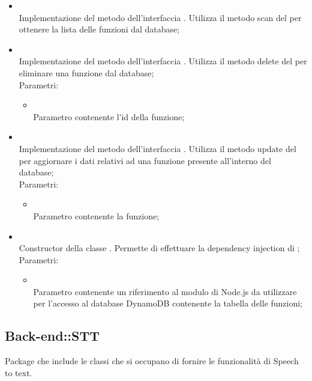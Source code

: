 \begin{itemize}
\begin{itemize}
		\item[]  \\
		Implementazione del metodo dell'interfaccia . Utilizza il metodo scan del  per ottenere la lista delle funzioni dal database;\\
		\item[]  \\
		Implementazione del metodo dell'interfaccia . Utilizza il metodo delete del  per eliminare una funzione dal database;\\
		Parametri:
		\begin{itemize}
			\item {} \\
			Parametro contenente l'id della funzione;
		\end{itemize}
		\item[]  \\
		Implementazione del metodo dell'interfaccia . Utilizza il metodo update del  per aggiornare i dati relativi ad una funzione presente all'interno del database;\\
		Parametri:
		\begin{itemize}
			\item {} \\
			Parametro contenente la funzione;
		\end{itemize}
		\item[]  \\
		Constructor della classe . Permette di effettuare la dependency injection di ;\\
		Parametri:
		\begin{itemize}
			\item {} \\
			Parametro contenente un riferimento al modulo di Node.js da utilizzare per l'accesso al database DynamoDB contenente la tabella delle funzioni;
		\end{itemize}
	\end{itemize}
\end{itemize}
\FloatBarrier

\subsection{Back-end::STT}
Package che include le classi che si occupano di fornire le funzionalità di Speech to text.
